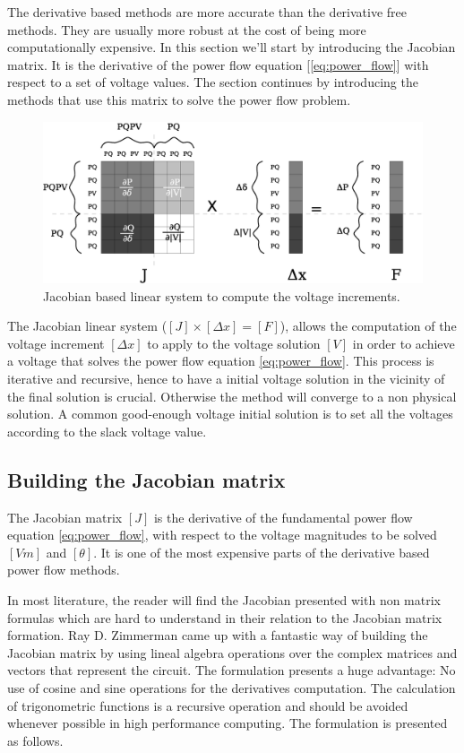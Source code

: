 \documentclass[nols,a4paper,twoside,notoc,fleqn]{tufte-book}
\begin{document}
The derivative based methods are more accurate than the derivative free methods. They are usually more robust at the cost of being more computationally expensive. In this section we'll start by introducing the Jacobian matrix. It is the derivative of the power flow equation  [\ref{eq:power_flow}] with respect to a set of voltage values. The section continues by introducing the methods that use this matrix to solve the power flow problem.

\begin{center}
\begin{figure}[h!]
  \includegraphics[width=0.9\linewidth]{img/JacobianBased.eps}
  \caption{Jacobian based linear system to compute the voltage increments.}
  \label{fig:jacobian_based}
\end{figure}
\end{center}

The Jacobian linear system ($[J] \times [\Delta x] = [F]$), allows the computation of the voltage increment $[\Delta x]$ to apply to the voltage solution $[V]$ in order to achieve a voltage that solves the power flow equation \ref{eq:power_flow}. This process is iterative and recursive, hence to have a initial voltage solution in the vicinity of the final solution is crucial. Otherwise the method will converge to a non physical solution. A common good-enough voltage initial solution is to set all the voltages according to the slack voltage value.


\subsection{Building the Jacobian matrix} \label{Jacobian_chapter}

The Jacobian matrix $[J]$ is the derivative of the fundamental power flow equation \ref{eq:power_flow}, with respect to the voltage magnitudes to be solved $[Vm]$ and $[\theta]$. It is one of the most expensive parts of the derivative based power flow methods.

In most literature, the reader will find the Jacobian presented with non matrix formulas which are hard to understand in their relation to the Jacobian matrix formation. Ray D. Zimmerman came up with a fantastic way of building the Jacobian matrix \cite{zimmerman2010ac} by using lineal algebra operations over the complex matrices and vectors that represent the circuit. The formulation presents a huge advantage: No use of cosine and sine operations for the derivatives computation. The calculation of trigonometric functions is a recursive operation and should be avoided whenever possible in high performance computing. The formulation is presented as follows.
\end{document}
